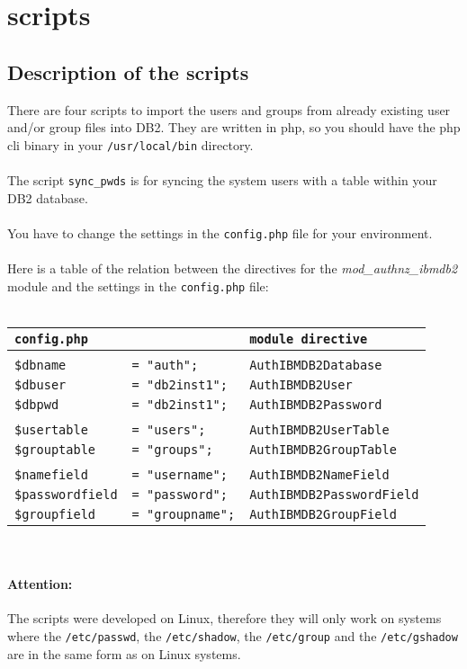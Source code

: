 \section{scripts}
\subsection{Description of the scripts}
There are four scripts to import the users and groups from already existing user and/or group files into DB2. They are written in php, so you should have the php cli binary in your {\tt /usr/local/bin} directory.\\
\\
The script {\tt sync\_pwds} is for syncing the system users with a table within your DB2 database.\\
\\
You have to change the settings in the {\tt config.php} file for your environment.\\
\\
Here is a table of the relation between the directives for the \emph{mod\_authnz\_ibmdb2} module
and the settings in the {\tt config.php} file:\\
\\
\begin{tabular}{@{} lll @{}}
{\tt config.php} & & {\tt module directive}\\
\hline
& & \\
{\tt \$dbname} & {\tt = "auth";} & {\tt AuthIBMDB2Database} \\
{\tt \$dbuser} & {\tt = "db2inst1";} & {\tt AuthIBMDB2User} \\
{\tt \$dbpwd} & {\tt = "db2inst1";} & {\tt AuthIBMDB2Password} \\
& & \\
{\tt \$usertable} & {\tt = "users";} & {\tt AuthIBMDB2UserTable} \\
{\tt \$grouptable} & {\tt = "groups";} & {\tt AuthIBMDB2GroupTable} \\
& & \\
{\tt \$namefield} & {\tt = "username";} & {\tt AuthIBMDB2NameField} \\	
{\tt \$passwordfield} & {\tt = "password";} & {\tt AuthIBMDB2PasswordField} \\
{\tt \$groupfield} & {\tt = "groupname";} & {\tt AuthIBMDB2GroupField} \\
\end{tabular}
\\
\paragraph{Attention:}{The scripts were developed on Linux, therefore they will only work on systems where the {\tt /etc/passwd}, the {\tt /etc/shadow}, the {\tt /etc/group} and the {\tt /etc/gshadow} are in the same form as on Linux systems.}
